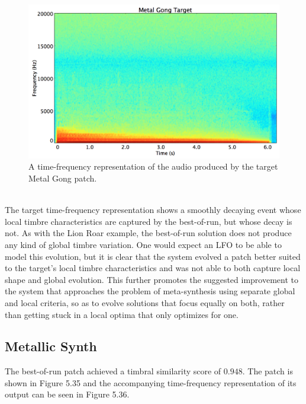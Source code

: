 \documentclass[a4paper,12pt]{report} 	%
\numberwithin{figure}{chapter}
\numberwithin{table}{chapter}
\numberwithin{equation}{chapter}
\begin{document}
\begin{flushleft}
\begin{figure}[h!]
\begin{center}
\includegraphics[scale=0.35,width=\linewidth]{MetalGongTargetSTFT}
\caption[Target Metal Gong Time-Frequency Representation]{A time-frequency representation of the audio produced by the target Metal Gong patch.}
\end{center}
\end{figure}
\\
The target time-frequency representation shows a smoothly decaying event whose local timbre characteristics are captured by the best-of-run, but whose decay is not. As with the Lion Roar example, the best-of-run solution does not produce any kind of global timbre variation. One would expect an LFO to be able to model this evolution, but it is clear that the system evolved a patch better suited to the target's local timbre characteristics and was not able to both capture local shape and global evolution. This further promotes the suggested improvement to the system that approaches the problem of meta-synthesis using separate global and local criteria, so as to evolve solutions that focus equally on both, rather than getting stuck in a local optima that only optimizes for one.

\clearpage
\subsection{Metallic Synth}

The best-of-run patch achieved a timbral similarity score of $0.948$. The patch is shown in Figure 5.35 and the accompanying time-frequency representation of its output can be seen in Figure 5.36.


\end{flushleft}
\end{document}
